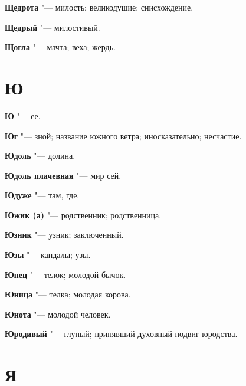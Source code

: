 \begin{mymulticols}{2}
\noindent\textbf{Щедрота} "--- милость; великодушие; снисхождение. 




\noindent\textbf{Щедрый} "--- милостивый. 




\noindent\textbf{Щогла} "--- мачта; веха; жердь. 




\section{Ю}





\noindent\textbf{Ю} "--- ее. 




\noindent\textbf{Юг} "--- зной; название южного ветра; иносказательно; несчастие. 




\noindent\textbf{Юдоль} "--- долина. 




\noindent\textbf{Юдоль плачевная} "--- мир сей. 




\noindent\textbf{Юдуже} "--- там, где. 




\noindent\textbf{Южик (а)} "--- родственник; родственница. 




\noindent\textbf{Юзник} "--- узник; заключенный. 




\noindent\textbf{Юзы} "--- кандалы; узы. 




\noindent\textbf{Юнец} "--- телок; молодой бычок. 




\noindent\textbf{Юница} "--- телка; молодая корова. 




\noindent\textbf{Юнота} "--- молодой человек. 




\noindent\textbf{Юродивый} "--- глупый; принявший духовный подвиг юродства. 




\section{Я}






\end{mymulticols}
